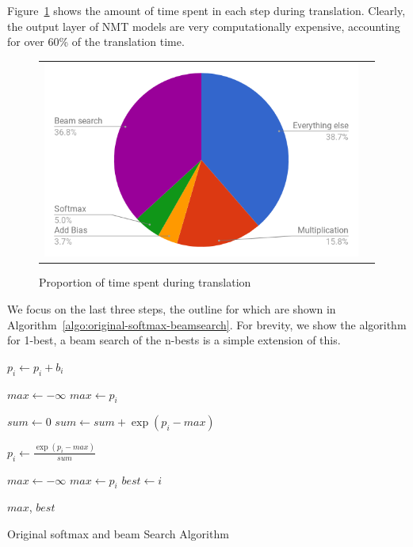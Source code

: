 \documentclass[11pt,a4paper]{article}
\begin{document}
Figure~\ref{fig:pie-time} shows the amount of time spent in each step during translation. Clearly, the output layer of NMT models are very computationally expensive, accounting for over 60\% of the translation time.

\begin{figure}
\centering
\begin{tabular}{cc}
{\includegraphics[scale=0.3]{pie-time.png}} 
\end{tabular}
\caption{Proportion of time spent during translation}
\label{fig:pie-time}
\end{figure} 

We focus on the last three steps, the outline for which are shown in Algorithm~\ref{algo:original-softmax-beamsearch}. For brevity, we show the algorithm for 1-best, a beam search of the n-bests is a simple extension of this.

\begin{algorithm} 
\begin{algorithmic}

  \State $p_i \gets p_i + b_i$
\EndFor 
\EndProcedure

\State


\State $max \gets - \infty$ 
    \State $max \gets p_i$
  \EndIf
\EndFor

\State $sum \gets 0$ 
  \State $sum \gets sum + \exp(p_i - max)$
\EndFor

  \State $p_i \gets \frac{\exp(p_i - max)}{sum} $
\EndFor 

\EndProcedure

\State


\State $max \gets - \infty$ 
    \State $max \gets p_i$
    \State $best \gets i$
  \EndIf
\EndFor 

\Return $max$, $best$

\EndProcedure

\end{algorithmic}
\caption{Original softmax and beam Search Algorithm}
\label{algo:original-softmax-beamsearch}
\end{algorithm}
\end{document}
